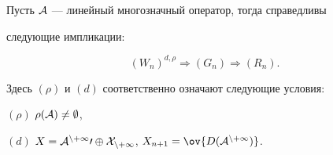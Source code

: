 \begin{prop} 


Пусть $\cal A$ --- линейный многозначный оператор, тогда справедливы 


следующие импликации\/${:}$ 


$$ 


(W_n)^{d,\rho}\Longrightarrow (G_n)\Longrightarrow(R_n). 


$$ 


Здесь $(\rho)$ и $(d)$ соответственно означают следующие условия\/${:}$ 


 


$(\rho)$ $\rho(\cal A)\ne\emptyset$, 


 


$(d)$ $X=\cal A^{n+1}0\oplus X_{n+1}$, $X_{n+1}=\ov{D(\cal A^{n+1})}$. 


\end{prop} 


 


